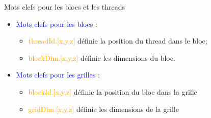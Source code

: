 \documentclass[handout,francais]{beamer}
\begin{document}
\begin{frame}[containsverbatim]{Mots clefs pour les blocs et les threads}
\begin{minipage}{5cm}
\begin{itemize}
\item \textcolor{blue}{Mots clefs pour les blocs} :
  \begin{itemize}
  \item \textcolor{orange}{threadId.[x,y,z]} définie la position du thread dans le bloc;
  \item \textcolor{orange}{blockDim.[x,y,z]} définie les dimensions du bloc.
  \end{itemize}
\item \textcolor{blue}{Mots clefs pour les grilles} :
  \begin{itemize}
  \item \textcolor{orange}{blockId.[x,y,z]} définie la position du bloc dans la grille
  \item \textcolor{orange}{gridDim.[x,y,z]} définie les dimensions de la grille
  \end{itemize}
\end{itemize}
\end{minipage}
\begin{minipage}[c]{55mm}
\end{minipage}
\end{frame}
\end{document}
